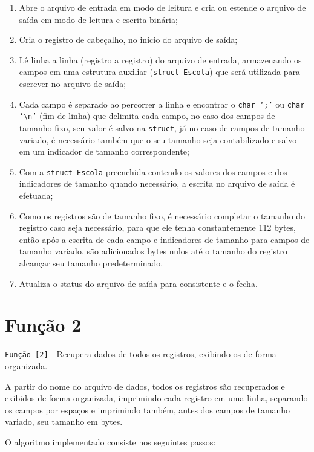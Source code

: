 \documentclass[
	12pt,				%
	openany,			%
	twoside,			%
	a4paper,			%
	english,			%
	french,				%
	spanish,			%
	brazil,				%
	]{abntex2}
\begin{document}
\begin{enumerate}
    \item Abre o arquivo de entrada em modo de leitura e cria ou estende o arquivo de saída em modo de leitura e escrita binária;
    \item Cria o registro de cabeçalho, no início do arquivo de saída;
    \item Lê linha a linha (registro a registro) do arquivo de entrada, armazenando os campos em uma estrutura auxiliar (\verb|struct Escola|) que será utilizada para escrever no arquivo de saída;
    \item Cada campo é separado ao percorrer a linha e encontrar o \verb|char ‘;’| ou \verb|char ‘\n’| (fim de linha) que delimita cada campo, no caso dos campos de tamanho fixo, seu valor é salvo na \verb|struct|, já no caso de campos de tamanho variado, é necessário também que o seu tamanho seja contabilizado e salvo em um indicador de tamanho correspondente;
    \item Com a \verb|struct Escola| preenchida contendo os valores dos campos e dos indicadores de tamanho quando necessário, a escrita no arquivo de saída é efetuada;
    \item Como os registros são de tamanho fixo, é necessário completar o tamanho do registro caso seja necessário, para que ele tenha constantemente 112 bytes, então após a escrita de cada campo e indicadores de tamanho para campos de tamanho variado, são adicionados bytes nulos até o tamanho do registro alcançar seu tamanho predeterminado.
    \item Atualiza o status do arquivo de saída para consistente e o fecha.
\end{enumerate}

\section{Função 2}

    \verb|Função [2]| - Recupera dados de todos os registros, exibindo-os de forma organizada.
    
A partir do nome do arquivo de dados, todos os registros são recuperados e exibidos de forma organizada, imprimindo cada registro em uma linha, separando os campos por espaços e imprimindo também, antes dos campos de tamanho variado, seu tamanho em bytes.

O algoritmo implementado consiste nos seguintes passos:
\end{document}
